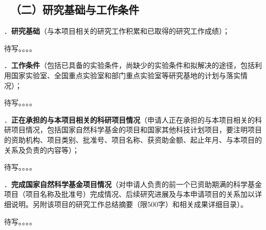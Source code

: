 {\color{MsBlue} \subsection{\texorpdfstring{\sihao \kaishu \quad \ （二）研究基础与工作条件}{（二）研究基础与工作条件}}}


{\sihao \color{MsBlue} ．{\bfseries 研究基础}（与本项目相关的研究工作积累和已取得的研究工作成绩）；}

待写。。。。

\vskip 5mm



{\sihao \color{MsBlue} ．{\bfseries 工作条件}（包括已具备的实验条件，尚缺少的实验条件和拟解决的途径，包括利用国家实验室、全国重点实验室和部门重点实验室等研究基地的计划与落实情况）；}

待写。。。。

\vskip 5mm



{\sihao \color{MsBlue} ．{\bfseries 正在承担的与本项目相关的科研项目情况}（申请人正在承担的与本项目相关的科研项目情况，\hspace{-0.5em}包括国家自然科学基金的项目和国家其他科技计划项目，要注明项目的资助机构、项目类别、批准号、项目名称、\hspace{-0.3em}获资助金额、\hspace{-0.3em}起止年月、\hspace{-0.3em}与本项目的关系及负责的内容等）；}

待写。。。。

\vskip 5mm



{\sihao \color{MsBlue} ．{\bfseries 完成国家自然科学基金项目情况}（对申请人负责的前一个已资助期满的科学基金项目（项目名称及批准号）完成情况、后续研究进展及与本申请项目的关系加以详细说明。\hspace{-0.5em}另附该项目的研究工作总结摘要（限500字）和相关成果详细目录）。}

待写。。。。

\vskip 5mm
